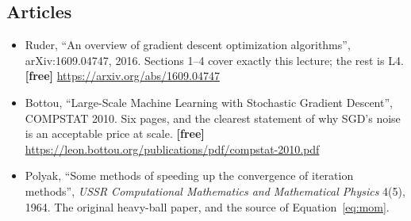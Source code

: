 \documentclass[11pt]{article}
\begin{document}
\subsection*{Articles}

\begin{itemize}[leftmargin=*]
  \item Ruder, ``An overview of gradient descent optimization algorithms'',
    arXiv:1609.04747, 2016. Sections 1--4 cover exactly this lecture; the rest
    is L4. \textbf{[free]} \url{https://arxiv.org/abs/1609.04747}
  \item Bottou, ``Large-Scale Machine Learning with Stochastic Gradient
    Descent'', COMPSTAT 2010. Six pages, and the clearest statement of why
    SGD's noise is an acceptable price at scale. \textbf{[free]}
    \url{https://leon.bottou.org/publications/pdf/compstat-2010.pdf}
  \item Polyak, ``Some methods of speeding up the convergence of iteration
    methods'', \emph{USSR Computational Mathematics and Mathematical Physics}
    4(5), 1964. The original heavy-ball paper, and the source of
    Equation~\eqref{eq:mom}.
\end{itemize}

\notesources{\AMLUnitIIISources}
\end{document}

